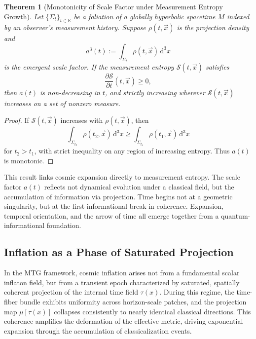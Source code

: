 \documentclass[11pt]{article}
\newtheorem{theorem}{Theorem}
\begin{document}
\begin{theorem}[Monotonicity of Scale Factor under Measurement Entropy Growth]
Let \( \{\Sigma_t\}_{t \in \mathbb{R}} \) be a foliation of a globally hyperbolic spacetime \( M \) indexed by an observer’s measurement history. Suppose \( \rho(t, \vec{x}) \) is the projection density and
\begin{equation*}
a^3(t) := \int_{\Sigma_t} \rho(t, \vec{x}) \, \mathrm{d}^3 x
\end{equation*}
is the emergent scale factor. If the measurement entropy \( \mathcal{S}(t, \vec{x}) \) satisfies
\[
\frac{\partial \mathcal{S}}{\partial t}(t, \vec{x}) \geq 0,
\]
then \( a(t) \) is non-decreasing in \( t \), and strictly increasing wherever \( \mathcal{S}(t, \vec{x}) \) increases on a set of nonzero measure.
\end{theorem}

\begin{proof}
If \( \mathcal{S}(t, \vec{x}) \) increases with \( \rho(t, \vec{x}) \), then
\[
\int_{\Sigma_{t_2}} \rho(t_2, \vec{x}) \, \mathrm{d}^3 x \geq \int_{\Sigma_{t_1}} \rho(t_1, \vec{x}) \, \mathrm{d}^3 x
\]
for \( t_2 > t_1 \), with strict inequality on any region of increasing entropy. Thus \( a(t) \) is monotonic.
\end{proof}

This result links cosmic expansion directly to measurement entropy. The scale factor \( a(t) \) reflects not dynamical evolution under a classical field, but the accumulation of information via projection. Time begins not at a geometric singularity, but at the first informational break in coherence. Expansion, temporal orientation, and the arrow of time all emerge together from a quantum-informational foundation.
\subsection{Inflation as a Phase of Saturated Projection}

In the MTG framework, cosmic inflation arises not from a fundamental scalar inflaton field, but from a transient epoch characterized by saturated, spatially coherent projection of the internal time field \( \tau(x) \). During this regime, the time-fiber bundle exhibits uniformity across horizon-scale patches, and the projection map \( \mu[\tau(x)] \) collapses consistently to nearly identical classical directions. This coherence amplifies the deformation of the effective metric, driving exponential expansion through the accumulation of classicalization events.
\end{document}
